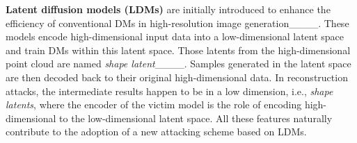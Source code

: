 \noindent\textbf{Latent diffusion models (LDMs)} are initially introduced to enhance the efficiency of conventional DMs in high-resolution image generation____. These models encode high-dimensional input data into a low-dimensional latent space and train DMs within this latent space. Those latents from the high-dimensional point cloud are named \textit{shape latent}____.
Samples generated in the latent space are then decoded back to their original high-dimensional data. 
In reconstruction attacks, the intermediate results happen to be in a low dimension, i.e., \textit{shape latents}, where the encoder of the victim model is the role of encoding high-dimensional to the low-dimensional latent space. All these features naturally contribute to the adoption of a new attacking scheme based on LDMs.
